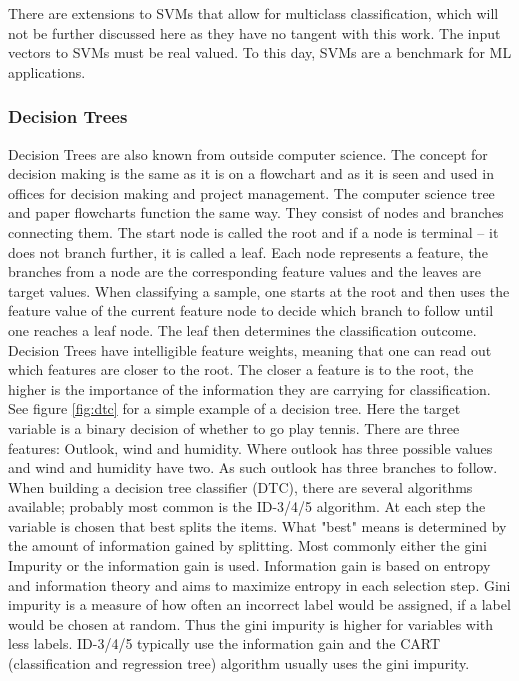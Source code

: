 There are extensions to SVMs that allow for multiclass classification, which will not be further discussed here as they have no tangent with this work. The input vectors to SVMs must be real valued. To this day, SVMs are a benchmark for ML applications.
\FloatBarrier

\subsubsection{Decision Trees}
\FloatBarrier
Decision Trees are also known from outside computer science. The concept for decision making is the same as it is on a flowchart and as it is seen and used in offices for decision making and project management. The computer science tree and paper flowcharts function the same way. They consist of nodes and branches connecting them. The start node is called the root and if a node is terminal -- it does not branch further, it is called a leaf. Each node represents a feature, the branches from a node are the corresponding feature values and the leaves are target values. When classifying a sample, one starts at the root and then uses the feature value of the current feature node to decide which branch to follow until one reaches a leaf node. The leaf then determines the classification outcome. Decision Trees have intelligible feature weights, meaning that one can read out which features are closer to the root. The closer a feature is to the root, the higher is the importance of the information they are carrying for classification. See figure \ref{fig:dtc} for a simple example of a decision tree. Here the target variable is a binary decision of whether to go play tennis. There are three features: Outlook, wind and humidity. Where outlook has three possible values and wind and humidity have two. As such outlook has three branches to follow.\\
When building a decision tree classifier (DTC), there are several algorithms available; probably most common is the ID-3/4/5 algorithm. At each step the variable is chosen that best splits the items. What "best" means is determined by the amount of information gained by splitting. Most commonly either the gini Impurity or the information gain is used. Information gain is based on entropy and information theory and aims to maximize entropy in each selection step. Gini impurity is a measure of how often an incorrect label would be assigned, if a label would be chosen at random. Thus the gini impurity is higher for variables with less labels. ID-3/4/5 typically use the information gain and the CART (classification and regression tree) algorithm usually uses the gini impurity.\\
